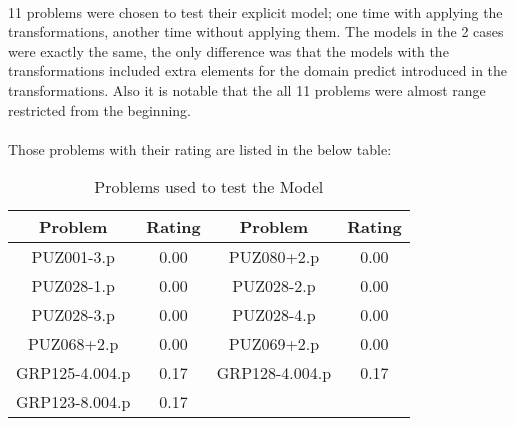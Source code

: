 \paragraph{}
11 problems were chosen to test their explicit model; one time with applying the transformations, another time without applying them. The models in the 2 cases were exactly the same, the only difference was that the models with the transformations included extra elements for the domain predict introduced in the transformations. Also it is notable that the all 11 problems were almost range restricted from the beginning.

\paragraph{}
Those problems with their rating are listed in the below table:

\begin{table}[H]
	\centering
	\begin{tabular}{|| c | c || c | c ||}
		\toprule
		Problem & Rating & Problem & Rating \\
		\midrule
		PUZ001-3.p      &  0.00  &  PUZ080+2.p      &  0.00 \\		
		PUZ028-1.p      &  0.00  &  PUZ028-2.p      &  0.00 \\
		PUZ028-3.p      &  0.00  &  PUZ028-4.p      &  0.00 \\
		PUZ068+2.p      &  0.00  &  PUZ069+2.p      &  0.00 \\
		GRP125-4.004.p  &  0.17  &  GRP128-4.004.p  &  0.17 \\		
		GRP123-8.004.p  &  0.17  &                  &       \\
		\bottomrule
	\end{tabular}
	\caption{Problems used to test the Model}
	\label{table:mode_with_&_without}
\end{table}







